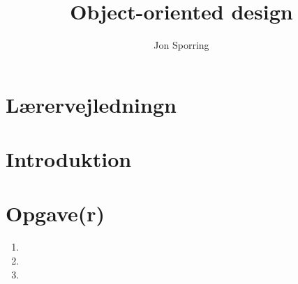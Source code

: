 \documentclass[a4paper,12pt]{article}
\title{Object-oriented design}
\author{Jon Sporring}
\begin{document}
\maketitle

\section{Lærervejledningn}

\section{Introduktion}

\section{Opgave(r)}
\begin{enumerate}
\item 
\item 
\item 
\end{enumerate}
\end{document}
